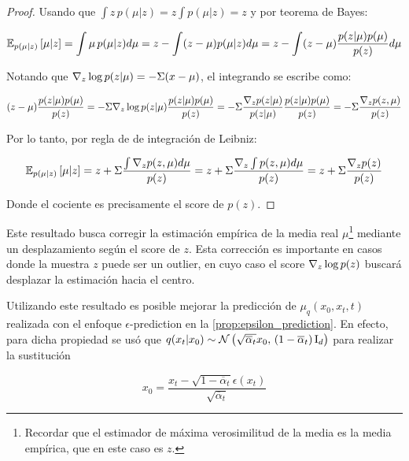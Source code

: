 \begin{proof}
    Usando que $\int z\,p(\mu|z) = z\int p(\mu|z)=z$ y por teorema de Bayes:

    \begin{equation}
        \mathbb{E}_{p(\mu|z)}\left[\mu|z\right] = \int \mu\, p(\mu|z)d\mu = z - \int (z-\mu)p(\mu|z) d\mu = z - \int (z-\mu)\frac{p(z|\mu)p(\mu)}{p(z)} d\mu
    \end{equation}

    Notando que $\nabla_{z} \log p(z|\mu) = -\Sigma (x-\mu)$, el integrando se escribe como:

    \begin{equation}
        (z-\mu)\frac{p(z|\mu)p(\mu)}{p(z)} = -\Sigma \nabla_{z} \log p(z|\mu) \frac{p(z|\mu)p(\mu)}{p(z)} = -\Sigma \frac{\nabla_z p(z|\mu)}{p(z|\mu)} \frac{p(z|\mu)p(\mu)}{p(z)} = -\Sigma \frac{\nabla_z p(z,\mu)}{p(z)}
    \end{equation}

    Por lo tanto, por regla de de integración de Leibniz:

    \begin{equation}
        \mathbb{E}_{p(\mu|z)}\left[\mu|z\right] = z + \Sigma \frac{\int \nabla_z p(z,\mu)d\mu}{p(z)} = z + \Sigma \frac{\nabla_z \int p(z,\mu)d\mu}{p(z)} = z + \Sigma \frac{\nabla_z p(z)}{p(z)}
    \end{equation}

    Donde el cociente es precisamente el score de $p(z)$.
\end{proof}

Este resultado busca corregir la estimación empírica de la media real $\mu$\footnote{Recordar que el estimador de máxima verosimilitud de la media es la media empírica, que en este caso es $z$.} mediante un desplazamiento según el score de $z$. Esta corrección es importante en casos donde la muestra $z$ puede ser un outlier, en cuyo caso el score $\nabla_{z} \log p(z)$ buscará desplazar la estimación hacia el centro.

Utilizando este resultado es posible mejorar la predicción de $\mu_q(x_0,x_t,t)$ realizada con el enfoque $\epsilon$-prediction en la \autoref{prop:epsilon_prediction}. En efecto, para dicha propiedad se usó que $q(x_t|x_0)\sim\mathcal{N}\left(\sqrt{\overline{\alpha}_t}x_0,\,(1-\overline{\alpha}_t)\operatorname{I}_{d}\right)$ para realizar la sustitución

\begin{equation}
    \label{eq:x0_epsilon_prediction}
    x_0 = \frac{x_t - \sqrt{1-\overline{\alpha}_t}\epsilon(x_t)}{\sqrt{\overline{\alpha}_t}}
\end{equation}

